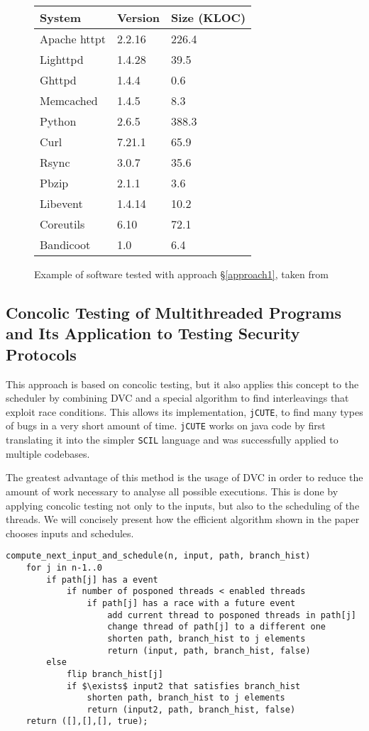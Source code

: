 \documentclass[10pt]{llncs}
\begin{document}
\begin{figure}
	\centering
	
	\begin{tabular}{l l l}
		System & Version & Size (KLOC) \\
		\hline
		Apache httpt & 2.2.16 & 226.4 \\
		Lighttpd & 1.4.28 & 39.5 \\
		Ghttpd & 1.4.4 & 0.6 \\
		Memcached & 1.4.5 & 8.3 \\
		Python & 2.6.5 & 388.3 \\
		Curl & 7.21.1 & 65.9 \\
		Rsync & 3.0.7 & 35.6 \\
		Pbzip & 2.1.1 & 3.6 \\
		Libevent & 1.4.14 & 10.2 \\
		Coreutils & 6.10 & 72.1 \\
		Bandicoot & 1.0 & 6.4
	\end{tabular}
	
	\caption{Example of software tested with approach §\ref{approach1}, taken from \cite{base3}}
	\label{example:3}
\end{figure}

\subsection{Concolic Testing of Multithreaded Programs and	Its Application to Testing Security Protocols \cite{base4}}
\label{jcute}
\label{approach2}

This approach is based on concolic testing, but it also applies this concept to the scheduler by combining DVC and a special algorithm to find interleavings that exploit race conditions. This allows its implementation, \texttt{jCUTE}, to find many types of bugs in a very short amount of time. \texttt{jCUTE} works on java code by first translating it into the simpler \texttt{SCIL} language and was successfully applied to multiple codebases.

The greatest advantage of this method is the usage of DVC in order to reduce the amount of work necessary to analyse all possible executions. This is done by applying concolic testing not only to the inputs, but also to the scheduling of the threads. We will concisely present how the efficient algorithm shown in the paper chooses inputs and schedules.

\begin{lstlisting}[mathescape,tabsize=2,basicstyle=\small]
compute_next_input_and_schedule(n, input, path, branch_hist)
	for j in n-1..0
		if path[j] has a event
			if number of posponed threads < enabled threads
				if path[j] has a race with a future event
					add current thread to posponed threads in path[j]
					change thread of path[j] to a different one
					shorten path, branch_hist to j elements
					return (input, path, branch_hist, false)
		else
			flip branch_hist[j]
			if $\exists$ input2 that satisfies branch_hist
				shorten path, branch_hist to j elements
				return (input2, path, branch_hist, false)
	return ([],[],[], true);
			
\end{lstlisting}
\end{document}
